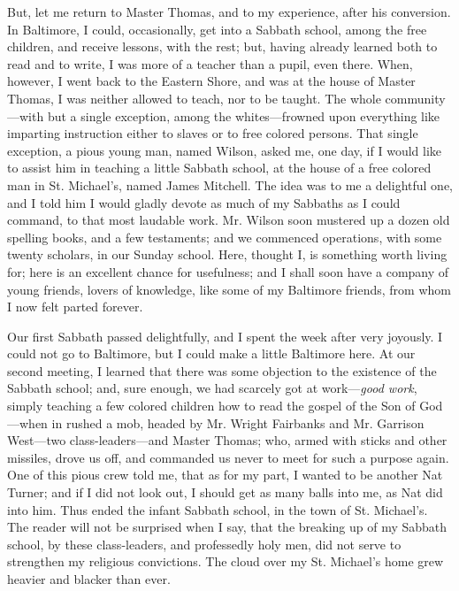 But, let me return to Master Thomas, and to my experience, after his
conversion. In Baltimore, I could, occasionally, get into a Sabbath
school, among the free children, and receive lessons, with the rest;
but, having already learned both to read and to write, I was more of a
teacher than a pupil, even there. When, however, I went back to the
Eastern Shore, and was at the house of Master Thomas, I was neither
allowed to teach, nor to be taught. The whole community---with but a
single exception, among the whites---frowned upon everything like
imparting instruction either to slaves or to free colored persons. That
single exception, a pious young man, named Wilson, asked me, one day, if
I would like to assist him in teaching a little Sabbath school, at the
house of a free colored man in St. Michael's, named James Mitchell. The
idea was to me a delightful one, and I told him I would gladly devote as
much of my Sabbaths as I could command, to that most laudable work. Mr.
Wilson soon mustered up a dozen old spelling books, and a few
testaments; and we commenced operations, with some twenty scholars, in
our {\protect\hypertarget{200}{}{}}Sunday school. Here, thought I, is
something worth living for; here is an excellent chance for usefulness;
and I shall soon have a company of young friends, lovers of knowledge,
like some of my Baltimore friends, from whom I now felt parted forever.

Our first Sabbath passed delightfully, and I spent the week after very
joyously. I could not go to Baltimore, but I could make a little
Baltimore here. At our second meeting, I learned that there was some
objection to the existence of the Sabbath school; and, sure enough, we
had scarcely got at work---\emph{good work}, simply teaching a few
colored children how to read the gospel of the Son of God---when in
rushed a mob, headed by Mr. Wright Fairbanks and Mr. Garrison West---two
class-leaders---and Master Thomas; who, armed with sticks and other
missiles, drove us off, and commanded us never to meet for such a
purpose again. One of this pious crew told me, that as for my part, I
wanted to be another Nat Turner; and if I did not look out, I should get
as many balls into me, as Nat did into him. Thus ended the infant
Sabbath school, in the town of St. Michael's. The reader will not be
surprised when I say, that the breaking up of my Sabbath school, by
these class-leaders, and professedly holy men, did not serve to
strengthen my religious convictions. The cloud over my St. Michael's
home grew heavier and blacker than ever.


